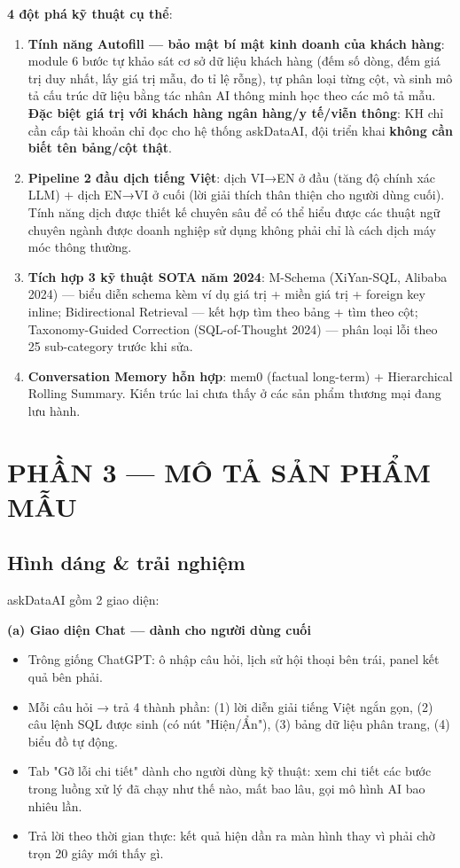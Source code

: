 \documentclass[11pt,a4paper]{article}
\begin{document}
\textbf{4 đột phá kỹ thuật cụ thể}:

\begin{enumerate}
\item \textbf{Tính năng Autofill --- bảo mật bí mật kinh doanh của khách hàng}: module 6 bước tự khảo sát cơ sở dữ liệu khách hàng (đếm số dòng, đếm giá trị duy nhất, lấy giá trị mẫu, đo tỉ lệ rỗng), tự phân loại từng cột, và sinh mô tả cấu trúc dữ liệu bằng tác nhân AI thông minh học theo các mô tả mẫu. \textbf{Đặc biệt giá trị với khách hàng ngân hàng/y tế/viễn thông}: KH chỉ cần cấp tài khoản chỉ đọc cho hệ thống askDataAI, đội triển khai \textbf{không cần biết tên bảng/cột thật}.
\item \textbf{Pipeline 2 đầu dịch tiếng Việt}: dịch VI→EN ở đầu (tăng độ chính xác LLM) + dịch EN→VI ở cuối (lời giải thích thân thiện cho người dùng cuối). Tính năng dịch được thiết kế chuyên sâu để có thể hiểu được các thuật ngữ chuyên ngành được doanh nghiệp sử dụng không phải chỉ là cách dịch máy móc thông thường.
\item \textbf{Tích hợp 3 kỹ thuật SOTA năm 2024}: M-Schema (XiYan-SQL, Alibaba 2024) --- biểu diễn schema kèm ví dụ giá trị + miền giá trị + foreign key inline; Bidirectional Retrieval --- kết hợp tìm theo bảng + tìm theo cột; Taxonomy-Guided Correction (SQL-of-Thought 2024) --- phân loại lỗi theo 25 sub-category trước khi sửa.
\item \textbf{Conversation Memory hỗn hợp}: mem0 (factual long-term) + Hierarchical Rolling Summary. Kiến trúc lai chưa thấy ở các sản phẩm thương mại đang lưu hành.
\end{enumerate}

\newpage
\section{PHẦN 3 --- MÔ TẢ SẢN PHẨM MẪU}

\subsection{Hình dáng \& trải nghiệm}

askDataAI gồm 2 giao diện:

\textbf{(a) Giao diện Chat --- dành cho người dùng cuối}
\begin{itemize}
\item Trông giống ChatGPT: ô nhập câu hỏi, lịch sử hội thoại bên trái, panel kết quả bên phải.
\item Mỗi câu hỏi → trả 4 thành phần: (1) lời diễn giải tiếng Việt ngắn gọn, (2) câu lệnh SQL được sinh (có nút "Hiện/Ẩn"), (3) bảng dữ liệu phân trang, (4) biểu đồ tự động.
\item Tab "Gỡ lỗi chi tiết" dành cho người dùng kỹ thuật: xem chi tiết các bước trong luồng xử lý đã chạy như thế nào, mất bao lâu, gọi mô hình AI bao nhiêu lần.
\item Trả lời theo thời gian thực: kết quả hiện dần ra màn hình thay vì phải chờ trọn 20 giây mới thấy gì.
\end{itemize}
\end{document}
